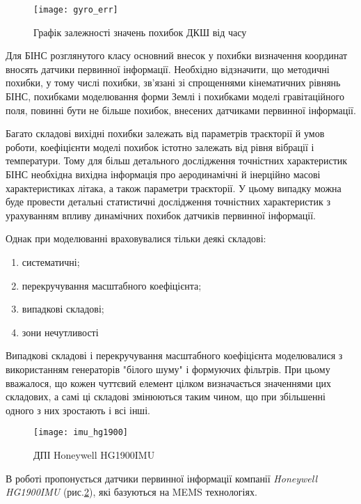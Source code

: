 \begin{figure}[here]
\centering
\texttt{[image: gyro\_err]}
\caption{Графік залежності значень похибок ДКШ від часу}
\label{fig:gyro_err}
\end{figure} 
Для БІНС розглянутого класу основний внесок у похибки визначення координат вносять датчики первинної 
інформації. Необхідно відзначити, що методичні похибки, у тому числі похибки, зв'язані зі спрощеннями 
кінематичних рівнянь БІНС, похибками моделювання форми Землі і похибками моделі гравітаційного поля, 
повинні бути не більше  похибок, внесених датчиками первинної інформації.

Багато складові вихідні похибки залежать від параметрів траєкторії й умов роботи, коефіцієнти моделі 
похибок істотно залежать від рівня вібрації і температури. Тому для більш детального дослідження 
точністних характеристик  БІНС необхідна вихідна інформація про аеродинамічні й інерційно масові 
характеристиках літака, а також параметри траєкторії. У цьому випадку можна буде провести детальні 
статистичні дослідження точністних характеристик з урахуванням впливу динамічних похибок датчиків первинної інформації.

Однак при моделюванні враховувалися тільки деякі складові:
\begin{enumerate}
  \item систематичні;
  \item перекручування масштабного коефіцієнта;
  \item випадкові складові;
  \item зони нечутливості
\end{enumerate}

Випадкові складові і перекручування масштабного коефіцієнта моделювалися 
з використанням генераторів "білого шуму" і формуючих фільтрів. При цьому 
вважалося, що кожен чуттєвий елемент цілком визначається значеннями цих 
складових, а самі ці складові змінюються таким чином, що при збільшенні 
одного з них зростають і всі інші. 
\begin{figure}[here]
\centering
\texttt{[image: imu\_hg1900]}
\caption{ДПІ Honeywell HG1900IMU}
\label{fig:imu_hg1900}
\end{figure} 
В роботі пропонується датчики первинної інформації компанії \textit{Honeywell HG1900IMU} (рис.\ref{fig:imu_hg1900}),
які базуються на MEMS технологіях. 


